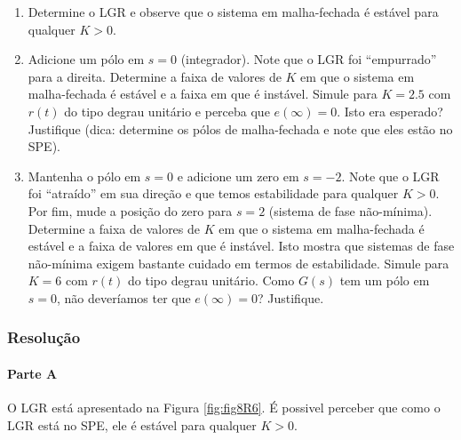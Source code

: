 \documentclass[
]{book}
\providecommand{\tightlist}{%
  \setlength{\itemsep}{0pt}\setlength{\parskip}{0pt}}
\theoremstyle{definition}
\theoremstyle{definition}
\theoremstyle{definition}
\theoremstyle{remark}
\begin{document}
\begin{enumerate}
\def\labelenumi{\alph{enumi}.}
\tightlist
\item
  Determine o LGR e observe que o sistema em malha-fechada é estável para qualquer \(K>0\).
\item
  Adicione um pólo em \(s=0\) (integrador). Note que o LGR foi ``empurrado'' para a direita. Determine a faixa de valores de \(K\) em que o sistema em malha-fechada é estável e a faixa em que é instável. Simule para \(K = 2.5\) com \(r(t)\) do tipo degrau unitário e perceba que \(e(\infty) = 0\). Isto era esperado? Justifique (dica: determine os pólos de malha-fechada e note que eles estão no SPE).
\item
  Mantenha o pólo em \(s=0\) e adicione um zero em \(s=-2\). Note que o LGR foi ``atraído'' em sua direção e que temos estabilidade para qualquer \(K>0\). Por fim, mude a posição do zero para \(s=2\) (sistema de fase não-mínima). Determine a faixa de valores de \(K\) em que o sistema em malha-fechada é estável e a faixa de valores em que é instável. Isto mostra que sistemas de fase não-mínima exigem bastante cuidado em termos de estabilidade. Simule para \(K=6\) com \(r(t)\) do tipo degrau unitário. Como \(G(s)\) tem um pólo em \(s=0\), não deveríamos ter que \(e(\infty) = 0\)? Justifique.
\end{enumerate}

\hypertarget{resoluuxe7uxe3o-25}{%
\subsubsection*{Resolução}\label{resoluuxe7uxe3o-25}}

\hypertarget{parte-a-12}{%
\paragraph{Parte A}\label{parte-a-12}}

O LGR está apresentado na Figura \ref{fig:fig8R6}. É possivel perceber que como o LGR está no SPE, ele é estável para qualquer \(K > 0\).
\end{document}
